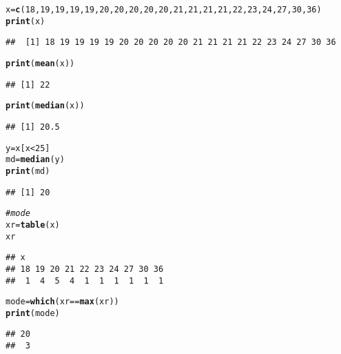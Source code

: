 \documentclass{article}\usepackage[]{graphicx}\usepackage[]{xcolor}
\makeatletter
\newcommand{\hlnum}[1]{\textcolor[rgb]{0.686,0.059,0.569}{#1}}%
\newcommand{\hlcom}[1]{\textcolor[rgb]{0.678,0.584,0.686}{\textit{#1}}}%
\newcommand{\hlopt}[1]{\textcolor[rgb]{0,0,0}{#1}}%
\newcommand{\hldef}[1]{\textcolor[rgb]{0.345,0.345,0.345}{#1}}%
\newcommand{\hlkwb}[1]{\textcolor[rgb]{0.69,0.353,0.396}{#1}}%
\newcommand{\hlkwd}[1]{\textcolor[rgb]{0.737,0.353,0.396}{\textbf{#1}}}%
\newenvironment{kframe}{%
 \def\at@end@of@kframe{}%
 \ifinner\ifhmode%
  \def\at@end@of@kframe{\end{minipage}}%
  \begin{minipage}{\columnwidth}%
 \fi\fi%
 \def\FrameCommand##1{\hskip\@totalleftmargin \hskip-\fboxsep
 \colorbox{shadecolor}{##1}\hskip-\fboxsep
     \hskip-\linewidth \hskip-\@totalleftmargin \hskip\columnwidth}%
 \MakeFramed {\advance\hsize-\width
   \@totalleftmargin\z@ \linewidth\hsize
   \@setminipage}}%
 {\par\unskip\endMakeFramed%
 \at@end@of@kframe}
\newenvironment{knitrout}{}{} %
\makeatother
\begin{document}
\begin{knitrout}
\color{fgcolor}\begin{kframe}
\begin{alltt}
\hldef{x}\hlkwb{=}\hlkwd{c}\hldef{(}\hlnum{18}\hldef{,}\hlnum{19}\hldef{,}\hlnum{19}\hldef{,}\hlnum{19}\hldef{,}\hlnum{19}\hldef{,}\hlnum{20}\hldef{,}\hlnum{20}\hldef{,}\hlnum{20}\hldef{,}\hlnum{20}\hldef{,}\hlnum{20}\hldef{,}\hlnum{21}\hldef{,}\hlnum{21}\hldef{,}\hlnum{21}\hldef{,}\hlnum{21}\hldef{,}\hlnum{22}\hldef{,}\hlnum{23}\hldef{,}\hlnum{24}\hldef{,}\hlnum{27}\hldef{,}\hlnum{30}\hldef{,}\hlnum{36}\hldef{)}
\hlkwd{print}\hldef{(x)}
\end{alltt}
\begin{verbatim}
##  [1] 18 19 19 19 19 20 20 20 20 20 21 21 21 21 22 23 24 27 30 36
\end{verbatim}
\begin{alltt}
\hlkwd{print}\hldef{(}\hlkwd{mean}\hldef{(x))}
\end{alltt}
\begin{verbatim}
## [1] 22
\end{verbatim}
\begin{alltt}
\hlkwd{print}\hldef{(}\hlkwd{median}\hldef{(x) )}
\end{alltt}
\begin{verbatim}
## [1] 20.5
\end{verbatim}
\begin{alltt}
\hldef{y}\hlkwb{=}\hldef{x[x}\hlopt{<}\hlnum{25}\hldef{]}
\hldef{md}\hlkwb{=}\hlkwd{median}\hldef{(y)}
\hlkwd{print}\hldef{(md)}
\end{alltt}
\begin{verbatim}
## [1] 20
\end{verbatim}
\begin{alltt}
\hlcom{#mode}
\hldef{xr}\hlkwb{=}\hlkwd{table}\hldef{(x)}
\hldef{xr}
\end{alltt}
\begin{verbatim}
## x
## 18 19 20 21 22 23 24 27 30 36 
##  1  4  5  4  1  1  1  1  1  1
\end{verbatim}
\begin{alltt}
\hldef{mode}\hlkwb{=}\hlkwd{which}\hldef{(xr}\hlopt{==}\hlkwd{max}\hldef{(xr))}
\hlkwd{print}\hldef{(mode)}
\end{alltt}
\begin{verbatim}
## 20 
##  3
\end{verbatim}
\end{kframe}
\end{knitrout}
\end{document}
